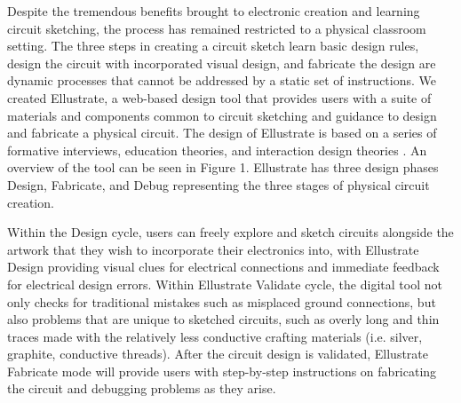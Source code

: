 \documentclass{sigchi}
\begin{document}
Despite the tremendous benefits brought to electronic creation and learning circuit sketching, the process has remained restricted to a physical classroom setting.
The three steps in creating a circuit sketch \textendash learn basic design rules, design the circuit with incorporated visual design, and fabricate the design \textendash are dynamic processes that cannot be addressed by a static set of instructions.
We created Ellustrate, a web-based design tool that provides users with a suite of materials and components common to circuit sketching and guidance to design and fabricate a physical circuit.
The design of Ellustrate is based on a series of formative interviews, education theories, and interaction design theories .
An overview of the tool can be seen in Figure 1. Ellustrate has three design phases \textendash Design, Fabricate, and Debug \textendash representing the three stages of physical circuit creation.

Within the Design cycle, users can freely explore and sketch circuits alongside the artwork that they wish to incorporate their electronics into, with Ellustrate Design providing visual clues for electrical connections and immediate feedback for electrical design errors.
Within Ellustrate Validate cycle, the digital tool not only checks for traditional mistakes such as misplaced ground connections, but also problems that are unique to sketched circuits, such as overly long and thin traces made with the relatively less conductive crafting materials (i.e. silver, graphite, conductive threads). After the circuit design is validated, Ellustrate Fabricate mode will provide users with step-by-step instructions on fabricating the circuit and debugging problems as they arise. 
\end{document}
